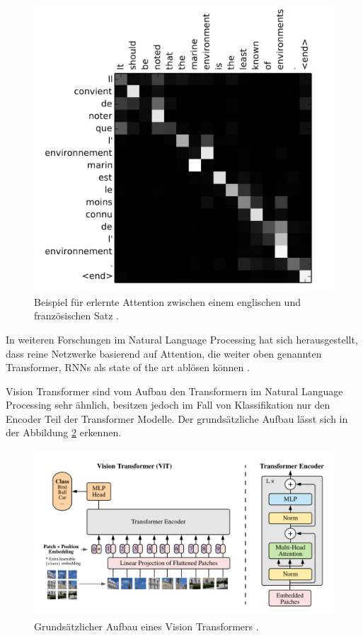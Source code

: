 \documentclass[twoside,a4paper]{IEEEtran}
\begin{document}
\begin{figure}[!htb]
	\includegraphics[width=\columnwidth]{attention_visualized}
	\caption{Beispiel für erlernte Attention zwischen einem englischen und französischen Satz \cite[S.6]{RNN_ATTENTION}.}
	\label{bild1}
\end{figure}
In weiteren Forschungen im Natural Language Processing hat sich herausgestellt, dass reine Netzwerke basierend auf Attention, die weiter oben genannten Transformer, RNNs als state of the art ablösen können \cite[S.2]{TRANSFORMERS}. 

Vision Transformer sind vom Aufbau den Transformern im Natural Language Processing sehr ähnlich, besitzen jedoch im Fall von Klassifikation nur den Encoder Teil der Transformer Modelle. Der grundsätzliche Aufbau lässt sich in der Abbildung \ref{vitimg} erkennen.

\begin{figure}[!htb]
	\includegraphics[width=\columnwidth]{vitimg}
	\caption{Grundsätzlicher Aufbau eines Vision Transformers \cite[S.3]{VIT}.}
	\label{vitimg}
\end{figure}
\end{document}
